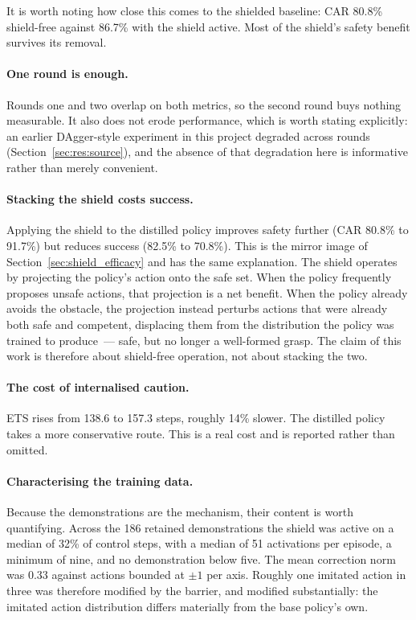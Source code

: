 It is worth noting how close this comes to the shielded baseline: CAR 80.8\% shield-free against
86.7\% with the shield active. Most of the shield's safety benefit survives its removal.

\paragraph{One round is enough.}
Rounds one and two overlap on both metrics, so the second round buys nothing measurable. It also
does not erode performance, which is worth stating explicitly: an earlier DAgger-style experiment
in this project degraded across rounds (Section~\ref{sec:res:source}), and the absence of that
degradation here is informative rather than merely convenient.

\paragraph{Stacking the shield costs success.}
Applying the shield to the distilled policy improves safety further (CAR 80.8\% to 91.7\%) but
reduces success (82.5\% to 70.8\%). This is the mirror image of Section~\ref{sec:shield_efficacy}
and has the same explanation. The shield operates by projecting the policy's action onto the safe
set. When the policy frequently proposes unsafe actions, that projection is a net benefit. When the
policy already avoids the obstacle, the projection instead perturbs actions that were already both
safe and competent, displacing them from the distribution the policy was trained to produce~---
safe, but no longer a well-formed grasp. The claim of this work is therefore about shield-free
operation, not about stacking the two.

\paragraph{The cost of internalised caution.}
ETS rises from 138.6 to 157.3 steps, roughly 14\% slower. The distilled policy takes a more
conservative route. This is a real cost and is reported rather than omitted.

\paragraph{Characterising the training data.}
Because the demonstrations are the mechanism, their content is worth quantifying. Across the 186
retained demonstrations the shield was active on a median of 32\% of control steps, with a median
of 51 activations per episode, a minimum of nine, and no demonstration below five. The mean
correction norm was 0.33 against actions bounded at $\pm 1$ per axis. Roughly one imitated action
in three was therefore modified by the barrier, and modified substantially: the imitated action
distribution differs materially from the base policy's own.

